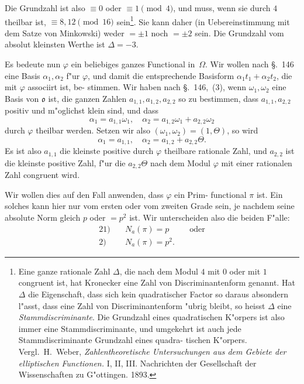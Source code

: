 \documentclass[12pt,a4paper]{article}
\theoremstyle{weber}
\begin{document}
Die Grundzahl ist also $\equiv 0$ oder $\equiv 1 \pmod{4}$, und muss,
wenn sie durch $4$ theilbar ist, $\equiv 8, 12 \pmod{16}$ sein\footnote{Eine ganze rationale Zahl $\varDelta$, die nach dem Modul $4$ mit $0$ oder
mit $1$ congruent ist, hat Kronecker eine Zahl von Discriminantenform
genannt. Hat $\varDelta$ die Eigenschaft, dass sich kein quadratischer Factor so
daraus absondern l"asst, dass eine Zahl von Discriminantenform "ubrig
bleibt, so heisst $\varDelta$ eine \emph{Stammdiscriminante}. Die Grundzahl eines
quadratischen K"orpers ist also immer eine Stammdiscriminante, und
umgekehrt ist auch jede Stammdiscriminante Grundzahl eines quadra-
tischen K"orpers. Vergl.\ H.~Weber, \emph{Zahlentheoretische Untersuchungen
aus dem Gebiete der elliptischen Functionen.} I, II, III. Nachrichten der
Gesellschaft der Wissenschaften zu G"ottingen. 1893.}. Sie kann
daher (in Uebereinstimmung mit dem Satze von Minkowski)
weder $= \pm 1$ noch $= \pm 2$ sein. Die Grundzahl vom absolut
kleinsten Werthe ist $\varDelta = -3$.

\bigskip

Es bedeute nun $\varphi$ ein beliebiges ganzes Functional in~$\varOmega$.
Wir wollen nach \S.~146 eine Basis $\alpha_1, \alpha_2$ f"ur $\varphi$, und damit die
entsprechende Basisform $\alpha_1t_1 + \alpha_2t_2$, die mit $\varphi$ associirt ist, be-
stimmen. Wir haben nach \S.~146,~(3), wenn $\omega_1, \omega_2$ eine Basis
von $\mathfrak{o}$ ist, die ganzen Zahlen $a_{1,1}, a_{1,2}, a_{2,2}$ so zu bestimmen, dass
$a_{1,1}, a_{2,2}$ positiv und m"oglichst klein sind, und dass
\[
\alpha_1 = a_{1,1}\omega_1, \quad \alpha_2 = a_{1,2}\omega_1 + a_{2,2}\omega_2
\]
durch $\varphi$ theilbar werden. Setzen wir also $(\omega_1, \omega_2) = (1, \varTheta)$, so
wird
\begin{equation}\label{eq:s165-1}
\alpha_1 = a_{1,1}, \quad \alpha_2 = a_{1,2} + a_{2,2}\varTheta.
\end{equation}
Es ist also $a_{1,1}$ die kleinste positive durch $\varphi$ theilbare rationale
Zahl, und $a_{2,2}$ ist die kleinste positive Zahl, f"ur die $a_{2,2}\varTheta$ nach
dem Modul $\varphi$ mit einer rationalen Zahl congruent wird.

Wir wollen dies auf den Fall anwenden, dass $\varphi$ ein Prim-
functional $\pi$ ist. Ein solches kann hier nur vom ersten oder
vom zweiten Grade sein, je nachdem seine absolute Norm gleich
$p$ oder $= p^2$ ist. Wir unterscheiden also die beiden F"alle:
\begin{alignat*}{2}
\text{1)}\quad & N_a(\pi) = p & \quad \text{oder} \\
\text{2)}\quad & N_a(\pi) = p^2. &
\end{alignat*}
\end{document}
